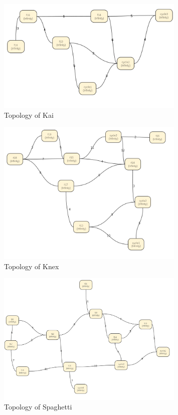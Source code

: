 \documentclass[11pt]{article}
\begin{document}
\begin{figure}
	\centering
	\includegraphics[width=0.8\textwidth,natwidth=800,natheight=800]{kai.png}
	\caption{Topology of Kai}
	\label{overflow}
\end{figure}
\begin{figure}
	\centering
	\includegraphics[width=0.8\textwidth,natwidth=900,natheight=900]{knex.png}
	\caption{Topology of Knex}
	\label{overflow}
\end{figure}
\begin{figure}
	\centering
	\includegraphics[width=0.8\textwidth,natwidth=1100,natheight=1100]{spaghetti.png}
	\caption{Topology of Spaghetti}
	\label{overflow}
\end{figure}
\end{document}
